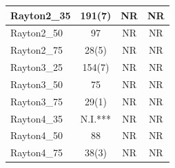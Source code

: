 \documentclass{abstract}
\begin{document}
\begin{table}[htbp]
\begin{tabularx}{\textwidth}{|L|c|c|c|}
        \hline
        Rayton2\_35 & 191(7) & NR & NR \\
        \hline
        Rayton2\_50 & 97 & NR & NR \\
        \hline
        Rayton2\_75 & 28(5) & NR & NR \\
        \hline
        Rayton3\_25 & 154(7) & NR & NR \\
        \hline
        Rayton3\_50 & 75 & NR & NR \\
        \hline
        Rayton3\_75 & 29(1) & NR & NR \\
        \hline
        Rayton4\_35 & N.I.*** & NR & NR \\
        \hline
        Rayton4\_50 & 88 & NR & NR \\
        \hline
        Rayton4\_75 & 38(3) & NR & NR \\
        \hline
    \end{tabularx}
\end{table}
\end{document}
